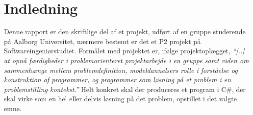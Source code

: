 \chapter{Indledning}\label{chap:indledning}



Denne rapport er den skriftlige del af et projekt, udført af en gruppe studerende på Aalborg Universitet, nærmere bestemt er det et P2 projekt på Softwareingeniørstudiet. Formålet med projektet er, ifølge
projektoplægget, \textit{``[..] at opnå færdigheder i problemorienteret projektarbejde i en gruppe samt viden
om sammenhænge mellem problemdefinition, modeldannelsers rolle i forståelse og konstruktion af programmer, og
programmer som løsning på et problem i en problemstilling kontekst.''} \citep{projektkatalog} Helt konkret skal der produceres et program i
C\#, der skal virke som en hel eller delvis løsning
på det problem, opstillet i det valgte emne.

